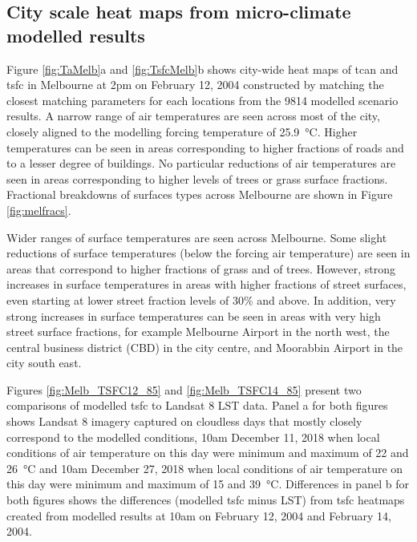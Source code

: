 \documentclass[final,3p,times,authoryear]{elsarticle}
\begin{document}
\subsection{City scale heat maps from micro-climate modelled results}\label{sec:resultsheatmaps}



Figure \ref{fig:TaMelb}a and \ref{fig:TsfcMelb}b shows city-wide heat maps of \gls{tcan} and \gls{tsfc} in Melbourne at 2pm on February 12, 2004 constructed by matching the closest matching parameters for each locations from the 9814 modelled scenario results. A narrow range of air temperatures are seen across most of the city, closely aligned to the modelling forcing temperature of 25.9\SI{}{\degreeCelsius}. Higher temperatures can be seen in areas corresponding to higher fractions of roads and to a lesser degree of buildings. No particular reductions of air temperatures are seen in areas corresponding to higher levels of trees or grass surface fractions. Fractional breakdowns of surfaces types across Melbourne are shown in Figure \ref{fig:melfracs}. 

Wider ranges of surface temperatures are seen across Melbourne. Some slight reductions of surface temperatures (below the forcing air temperature) are seen in areas that correspond to higher fractions of grass and of trees. However, strong increases in surface temperatures in areas with higher fractions of street surfaces, even starting at lower street fraction levels of 30\% and above.  In addition, very strong increases in surface temperatures can be seen in areas with very high street surface fractions, for example Melbourne Airport in the north west, the central business district (CBD) in the city centre, and Moorabbin Airport in the city south east.




Figures \ref{fig:Melb_TSFC12_85} and \ref{fig:Melb_TSFC14_85} present two comparisons of modelled \gls{tsfc} to Landsat 8 LST data. Panel a for both figures shows Landsat 8 imagery captured on cloudless days that mostly closely correspond to the modelled conditions, 10am December 11, 2018 when local conditions of air temperature on this day were minimum and maximum of 22 and 26\SI{}{\degreeCelsius} and 10am December 27, 2018 when local conditions of air temperature on this day were minimum and maximum of 15 and 39\SI{}{\degreeCelsius}. Differences in panel b for both figures shows the differences (modelled \gls{tsfc} minus LST) from \gls{tsfc} heatmaps created from modelled results at 10am on February 12, 2004 and February 14, 2004. 
\end{document}
